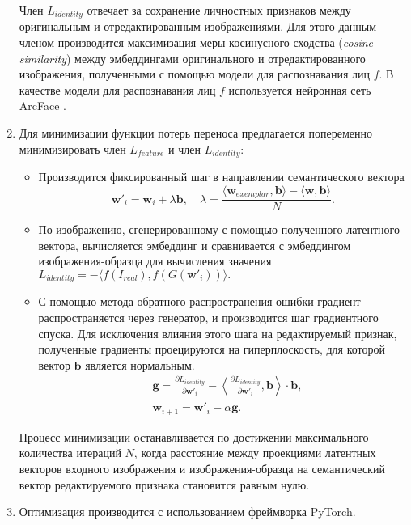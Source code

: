 \begin{enumerate}
Член $L_{identity}$ отвечает за сохранение личностных признаков между оригинальным и отредактированным изображениями. Для этого данным членом производится максимизация меры косинусного сходства (\emph{cosine similarity}) между эмбеддингами оригинального и отредактированного изображения, полученными с помощью модели для распознавания лиц $f$.
В качестве модели для распознавания лиц $f$ используется нейронная сеть ArcFace \cite{deng2018arcface}.

\item
Для минимизации функции потерь переноса предлагается попеременно минимизировать член $L_{feature}$ и член $L_{identity}$:
\begin{itemize}
    \item Производится фиксированный шаг в направлении семантического вектора
    $$\mathbf w'_i = \mathbf w_i + \lambda \mathbf b, \quad \lambda = \frac{\langle \mathbf w_{exemplar}, \mathbf b \rangle - \langle \mathbf w, \mathbf b \rangle}{N}.$$
    \item По изображению, сгенерированному с помощью полученного латентного вектора, вычисляется эмбеддинг и сравнивается с эмбеддингом изображения-образца для вычисления значения
    $L_{identity} = - \langle f(I_{real}), f(G(\mathbf w'_i)) \rangle.$
    \item С помощью метода обратного распространения ошибки градиент распространяется через генератор, и производится шаг градиентного спуска.
    Для исключения влияния этого шага на редактируемый признак, полученные градиенты проецируются на гиперплоскость, для которой вектор $\mathbf b$ является нормальным.
    \begin{align*}
    &\mathbf g = \frac{\partial L_{identity}}{\partial \mathbf w'_i} - \left\langle {\frac{\partial L_{identity}}{\partial \mathbf w'_i} , \mathbf b} \right\rangle \cdot \mathbf b,\\
    &\mathbf w_{i+1} = \mathbf w'_i - \alpha \mathbf g.
    \end{align*}
\end{itemize}

Процесс минимизации останавливается по достижении максимального количества итераций $N$, когда расстояние между проекциями латентных векторов входного изображения и изображения-образца на семантический вектор редактируемого признака становится равным нулю.

\item
Оптимизация производится с использованием фреймворка PyTorch.

\end{enumerate}